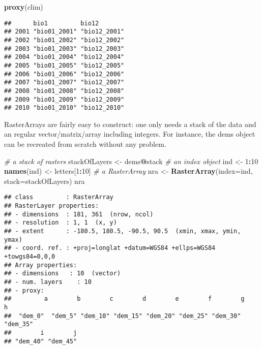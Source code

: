 \documentclass[]{article}
\newenvironment{Shaded}{\begin{snugshade}}{\end{snugshade}}
\newcommand{\KeywordTok}[1]{\textcolor[rgb]{0.13,0.29,0.53}{\textbf{#1}}}
\newcommand{\DataTypeTok}[1]{\textcolor[rgb]{0.13,0.29,0.53}{#1}}
\newcommand{\DecValTok}[1]{\textcolor[rgb]{0.00,0.00,0.81}{#1}}
\newcommand{\StringTok}[1]{\textcolor[rgb]{0.31,0.60,0.02}{#1}}
\newcommand{\CommentTok}[1]{\textcolor[rgb]{0.56,0.35,0.01}{\textit{#1}}}
\newcommand{\OperatorTok}[1]{\textcolor[rgb]{0.81,0.36,0.00}{\textbf{#1}}}
\newcommand{\NormalTok}[1]{#1}
\begin{document}
\begin{Shaded}
\begin{Highlighting}[]
\KeywordTok{proxy}\NormalTok{(clim)}
\end{Highlighting}
\end{Shaded}

\begin{verbatim}
##      bio1         bio12       
## 2001 "bio01_2001" "bio12_2001"
## 2002 "bio01_2002" "bio12_2002"
## 2003 "bio01_2003" "bio12_2003"
## 2004 "bio01_2004" "bio12_2004"
## 2005 "bio01_2005" "bio12_2005"
## 2006 "bio01_2006" "bio12_2006"
## 2007 "bio01_2007" "bio12_2007"
## 2008 "bio01_2008" "bio12_2008"
## 2009 "bio01_2009" "bio12_2009"
## 2010 "bio01_2010" "bio12_2010"
\end{verbatim}

RasterArrays are fairly easy to construct: one only needs a stack of the
data and an regular vector/matrix/array including integers. For
instance, the dems object can be recreated from scratch without any
problem.

\begin{Shaded}
\begin{Highlighting}[]
\CommentTok{# a stack of rasters}
\NormalTok{stackOfLayers <-}\StringTok{ }\NormalTok{dems}\OperatorTok{@}\NormalTok{stack}
\CommentTok{# an index object}
\NormalTok{ind <-}\StringTok{ }\DecValTok{1}\OperatorTok{:}\DecValTok{10}
\KeywordTok{names}\NormalTok{(ind) <-}\StringTok{ }\NormalTok{letters[}\DecValTok{1}\OperatorTok{:}\DecValTok{10}\NormalTok{]}
\CommentTok{# a RasterArray}
\NormalTok{nra  <-}\StringTok{ }\KeywordTok{RasterArray}\NormalTok{(}\DataTypeTok{index=}\NormalTok{ind, }\DataTypeTok{stack=}\NormalTok{stackOfLayers)}
\NormalTok{nra}
\end{Highlighting}
\end{Shaded}

\begin{verbatim}
## class         : RasterArray 
## RasterLayer properties: 
## - dimensions  : 181, 361  (nrow, ncol)
## - resolution  : 1, 1  (x, y)
## - extent      : -180.5, 180.5, -90.5, 90.5  (xmin, xmax, ymin, ymax)
## - coord. ref. : +proj=longlat +datum=WGS84 +ellps=WGS84 +towgs84=0,0,0 
## Array properties: 
## - dimensions   : 10  (vector)
## - num. layers    : 10
## - proxy:
##         a        b        c        d        e        f        g        h 
##  "dem_0"  "dem_5" "dem_10" "dem_15" "dem_20" "dem_25" "dem_30" "dem_35" 
##        i        j 
## "dem_40" "dem_45"
\end{verbatim}
\end{document}
